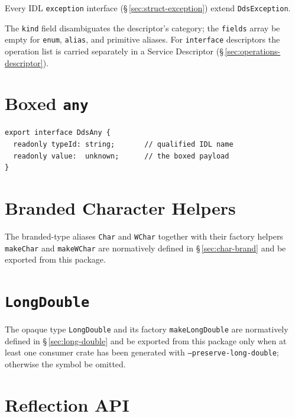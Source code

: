 \documentclass{../styles/zerodds-vendor-spec}
\begin{document}
Every IDL \texttt{exception} interface (\S\,\ref{sec:struct-exception})
 extend \texttt{DdsException}.

The \texttt{kind} field disambiguates the descriptor's category;
the \texttt{fields} array  be empty for
\texttt{enum}, \texttt{alias}, and primitive aliases. For
\texttt{interface} descriptors the operation list is carried
separately in a Service Descriptor
(\S\,\ref{sec:operations-descriptor}).

\section{Boxed \texttt{any}}\label{sec:descriptor-any}

\begin{lstlisting}
export interface DdsAny {
  readonly typeId: string;       // qualified IDL name
  readonly value:  unknown;      // the boxed payload
}
\end{lstlisting}

\section{Branded Character Helpers}

The branded-type aliases \texttt{Char} and \texttt{WChar} together
with their factory helpers \texttt{makeChar} and \texttt{makeWChar}
are normatively defined in \S\,\ref{sec:char-brand} and
 be exported from this package.

\section{\texttt{LongDouble}}

The opaque type \texttt{LongDouble} and its factory
\texttt{makeLongDouble} are normatively defined in
\S\,\ref{sec:long-double} and  be exported from this
package only when at least one consumer crate has been generated
with \texttt{--preserve-long-double}; otherwise the symbol
 be omitted.

\section{Reflection API}\label{sec:descriptor-reflection}
\end{document}
